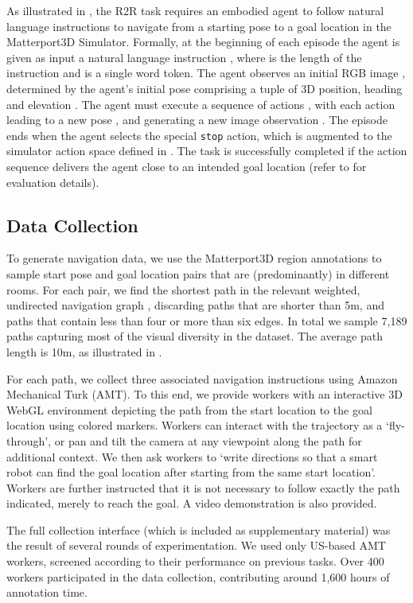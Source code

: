 \documentclass[10pt,twocolumn,letterpaper]{article}
\begin{document}
As illustrated in , the R2R task requires an embodied agent to follow natural language instructions to navigate from a starting pose to a goal location in the Matterport3D Simulator. Formally, at the beginning of each episode the agent is given as input a natural language instruction , where  is the length of the instruction and  is a single word token. The agent observes an initial RGB image , determined by the agent's initial pose comprising a tuple of 3D position, heading and elevation . The agent must execute a sequence of actions , with each action  leading to a new pose , and generating a new image observation . The episode ends when the agent selects the special \texttt{stop} action, which is augmented to the simulator action space defined in . The task is successfully completed if the action sequence delivers the agent close to an intended goal location  (refer to  for evaluation details). 


\subsection{Data Collection}
\label{sec:collection}

To generate navigation data, we use the Matterport3D region annotations to sample start pose  and goal location  pairs that are (predominantly) in different rooms. For each pair, we find the shortest path  in the relevant weighted, undirected navigation graph , discarding paths that are shorter than 5m, and paths that contain less than four or more than six edges. In total we sample 7,189 paths capturing most of the visual diversity in the dataset. The average path length is 10m, as illustrated in .

For each path, we collect three associated navigation instructions using Amazon Mechanical Turk (AMT). To this end, we provide workers with an interactive 3D WebGL environment depicting the path from the start location to the goal location using colored markers. Workers can interact with the trajectory as a `fly-through', or pan and tilt the camera at any viewpoint along the path for additional context. We then ask workers to `write directions so that a smart robot can find the goal location after starting from the same start location'. Workers are further instructed that it is not necessary to follow exactly the path indicated, merely to reach the goal. A video demonstration is also provided. 

The full collection interface (which is included as supplementary material) was the result of several rounds of experimentation. We used only US-based AMT workers, screened according to their performance on previous tasks. Over 400 workers participated in the data collection, contributing around 1,600 hours of annotation time.
\end{document}
